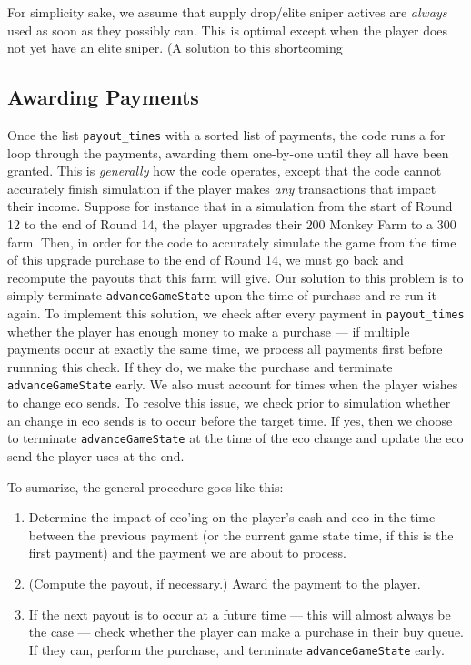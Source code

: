 \documentclass[12pt,letterpaper]{article}
\theoremstyle{remark}
\theoremstyle{plain}
\begin{document}
For simplicity sake, we assume that   supply drop/elite sniper actives are \textit{always} used as soon as they possibly can. This is optimal except when the player does not yet have an elite sniper. (A solution to this shortcoming 

\subsection{Awarding Payments}\label{awarding payments}

Once the list \texttt{payout\_times} with a sorted list of payments, the code runs a for loop through the payments, awarding them one-by-one until they all have been granted. This is \textit{generally} how the code operates, except that the code cannot accurately finish simulation if the player makes \textit{any} transactions that impact their income. Suppose for instance that in a simulation from the start of Round 12 to the end of Round 14, the player upgrades their $200$ Monkey Farm to a $300$ farm. Then, in order for the code to accurately simulate the game from the time of this upgrade purchase to the end of Round 14, we must go back and recompute the payouts that this farm will give. Our solution to this problem is to simply terminate \texttt{advanceGameState} upon the time of purchase and re-run it again. To implement this solution, we check after every payment in \texttt{payout\_times} whether the player has enough money to make a purchase --- if multiple payments occur at exactly the same time, we process all payments first before runnning this check. If they do, we make the purchase and terminate \texttt{advanceGameState} early. We also must account for times when the player wishes to change eco sends. To resolve this issue, we check prior to simulation whether an change in eco sends is to occur before the target time. If yes, then we choose to terminate \texttt{advanceGameState} at the time of the eco change and update the eco send the player uses at the end.

To sumarize, the general procedure goes like this:

\begin{enumerate}
    \item Determine the impact of eco'ing on the player's cash and eco in the time between the previous payment (or the current game state time, if this is the first payment) and the payment we are about to process.
    \item (Compute the payout, if necessary.) Award the payment to the player.
    \item If the next payout is to occur at a future time --- this will almost always be the case --- check whether the player can make a purchase in their buy queue. If they can, perform the purchase, and terminate \texttt{advanceGameState} early.
\end{enumerate}
\end{document}
